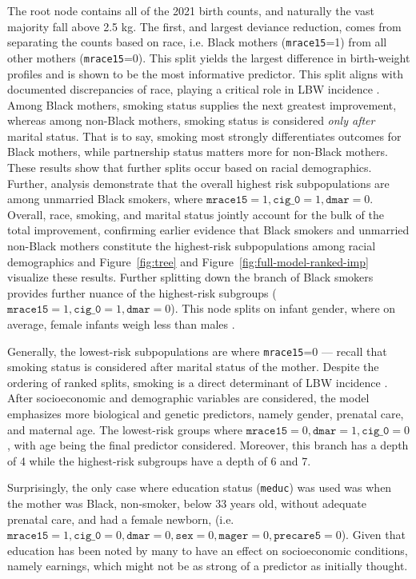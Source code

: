 The root node contains all of the 2021 birth counts, and naturally the vast majority fall above 2.5 kg. The first, and largest deviance reduction, comes from separating the counts based on race, i.e. Black mothers (\texttt{mrace15}=1) from all other mothers (\texttt{mrace15}=0). This split yields the largest difference in birth-weight profiles and is shown to be the most informative predictor. This split aligns with documented discrepancies of race, playing a critical role in LBW incidence \parencite{kff_maternal_infant_health, pmc1751798}. Among Black mothers, smoking status supplies the next greatest improvement, whereas among non-Black mothers, smoking status is considered \emph{only after} marital status. That is to say, smoking most strongly differentiates outcomes for Black mothers, while partnership status matters more for non-Black mothers. These results show that further splits occur based on racial demographics. Further, analysis demonstrate that the overall highest risk subpopulations are among unmarried Black smokers, where \(\texttt{mrace15}=1,\texttt{cig\_0}=1, \texttt{dmar}=0\). Overall, race, smoking, and marital status jointly account for the bulk of the total improvement, confirming earlier evidence that Black smokers and unmarried non-Black mothers constitute the highest-risk subpopulations among racial demographics \parencite{kff_maternal_infant_health,pmc1751798, smoking_lbw} and Figure~\ref{fig:tree} and Figure~\ref{fig:full-model-ranked-imp} visualize these results. Further splitting down the branch of Black smokers provides further nuance of the highest-risk subgroups (\(\texttt{mrace15}=1,\texttt{cig\_0}=1, \texttt{dmar}=0\)). This node splits on infant gender, where on average, female infants weigh less than males \parencite{decreasing_sex_diff_birth_weight2009}. 

Generally, the lowest-risk subpopulations are where \texttt{mrace15}=0 — recall that smoking status is considered after marital status of the mother. Despite the ordering of ranked splits, smoking is a direct determinant of LBW incidence \parencite{smoking_lbw}. After socioeconomic and demographic variables are considered, the model emphasizes more biological and genetic predictors, namely gender, prenatal care, and maternal age. The lowest-risk groups where \(\texttt{mrace15}=0, \texttt{dmar}=1,\texttt{cig\_0}=0\), with age being the final predictor considered. Moreover, this branch has a depth of 4 while the highest-risk subgroups have a depth of 6 and 7. 

Surprisingly, the only case where education status (\texttt{meduc}) was used was when the mother was Black, non-smoker, below 33 years old, without adequate prenatal care, and had a female newborn, (i.e. \(\texttt{mrace15} = 1, \texttt{cig\_0} = 0,\texttt{dmar}=0, \texttt{sex}=0, \texttt{mager}=0,\texttt{precare5}=0\)). Given that education has been noted by many \parencite{edu_lbw} to have an effect on socioeconomic conditions, namely earnings, which might not be as strong of a predictor as initially thought.

